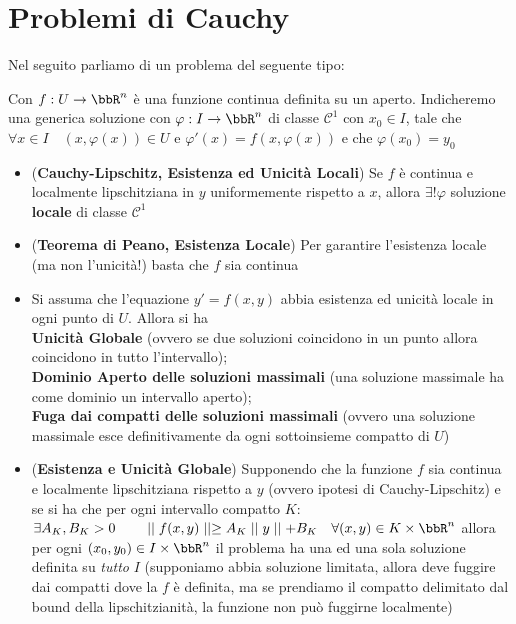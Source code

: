 \documentclass[a4paper,NoNotes,GeneralMath]{stdmdoc}
\begin{document}
	\section*{Problemi di Cauchy}
	Nel seguito parliamo di un problema del seguente tipo:
	\par
	Con $f: U \rightarrow \bbR^n$ è una funzione continua definita su un aperto.
	Indicheremo una generica soluzione con $\varphi: I \rightarrow \bbR^n$ di classe $\mathcal{C}^1$ con $x_0 \in I$, tale che $\forall x \in I \quad (x, \varphi(x)) \in U$ e $\varphi'(x) = f(x, \varphi(x))$ e che $\varphi(x_0) = y_0$
	\begin{itemize}
		\item ({\bf Cauchy-Lipschitz, Esistenza ed Unicità Locali}) Se $f$ è continua e localmente lipschitziana in $y$ uniformemente rispetto a $x$, allora $\exists! \varphi$ soluzione {\bf locale} di classe $\mathcal{C}^1$
		\item ({\bf Teorema di Peano, Esistenza Locale}) Per garantire l'esistenza locale (ma non l'unicità!) basta che $f$ sia continua
		\item Si assuma che l'equazione $y' = f(x,y)$ abbia esistenza ed unicità locale in ogni punto di $U$. Allora si ha \\ {\bf Unicità Globale} (ovvero se due soluzioni coincidono in un punto allora coincidono in tutto l'intervallo); \\ {\bf Dominio Aperto delle soluzioni massimali} (una soluzione massimale ha come dominio un intervallo aperto); \\ {\bf Fuga dai compatti delle soluzioni massimali} (ovvero una soluzione massimale esce definitivamente da ogni sottoinsieme compatto di $U$)
		\item ({\bf Esistenza e Unicità Globale}) Supponendo che la funzione $f$ sia continua e localmente lipschitziana rispetto a $y$ (ovvero ipotesi di Cauchy-Lipschitz) e se si ha che per ogni intervallo compatto $K$: $\exists A_K, B_K > 0 \qquad \norma{f(x,y)} \ge A_K \norma{y} + B_K \quad \forall (x,y) \in K \times \bbR^n$ allora per ogni $(x_0, y_0) \in I\times \bbR^n$ il problema ha una ed una sola soluzione definita su {\it tutto} $I$ (supponiamo abbia soluzione limitata, allora deve fuggire dai compatti dove la $f$ è definita, ma se prendiamo il compatto delimitato dal bound della lipschitzianità, la funzione non può fuggirne localmente)
	\end{itemize}
\end{document}
